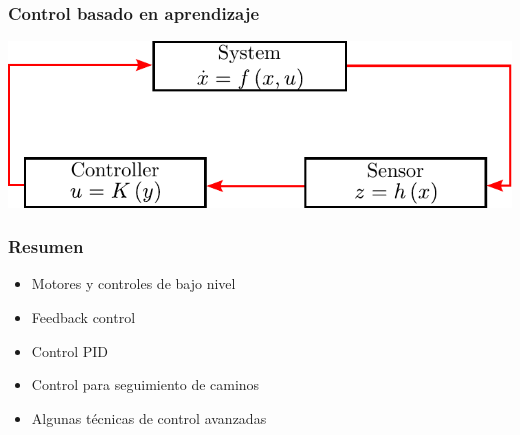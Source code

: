 \begin{frame}
    \frametitle{Control basado en aprendizaje}
    
    \begin{center}
        \includegraphics[width=0.7\columnwidth]{./images/learning_based_control.pdf}
    \end{center}
    
\end{frame}

\begin{frame}
    \frametitle{Resumen}
    
    \begin{itemize}
        \item Motores y controles de bajo nivel
        \item Feedback control
        \item Control PID
        \item Control para seguimiento de caminos
        \item Algunas técnicas de control avanzadas
    \end{itemize}
    
\end{frame}